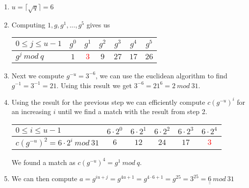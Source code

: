 \begin{enumerate}
\item $u = \lceil \sqrt{q} \rceil = 6$
\item Computing $1,g,g^1,...,g^5$ gives us  \\

\begin{tabular}{|l|c|c|c|c|c|c|}
    \hline  
    $0 \leq j \leq u-1$             &   $g^0$   &   $g^1$     &   $g^2$     &   $g^3$     &   $g^4$     &   $g^5$     \\
    \hline  
    $g^j \ mod \ q$ &   $1$       &   \textcolor{red}{$3$}       &   $9$       &   $27$      &   $17$      &   $26$      \\
    \hline 
\end{tabular}

\item Next we compute $g^{-u} = 3^{-6}$, we can use the euclidean algorithm to find $g^{-1} = 3^{-1} = 21$. Using this result we get $3^{-6} = 21^6 = 2 \ mod \ 31$. 

\item Using the result for the previous step we can efficiently compute $c(g^{-u})^i$ for an increasing $i$ until we find a match with the result from step 2. \\

\iffalse
\begin{align*}
    c(g^{-u})^0 &= 6 \cdot 2^0 = 6 \\
    c(g^{-u})^1 &= 6 \cdot 2^1 = 12 \\
    c(g^{-u})^2 &= 6 \cdot 2^2 = 24 \\
    c(g^{-u})^3 &= 6 \cdot 2^3 = 17 \ mod \ 31 \\
    c(g^{-u})^4 &= 6 \cdot 2^4 = 3 \ mod \ 13
\end{align*}
\fi 

\begin{tabular}{|l|c|c|c|c|c|}
    \hline  
    $0 \leq i \leq u-1$    &   $6 \cdot 2^0$   &   $6 \cdot 2^1$     &   $6 \cdot 2^2$     &   $6 \cdot 2^3$     &   $6 \cdot 2^4$        \\
    \hline  
    $c(g^{-u})^2 = 6 \cdot 2^i \ mod \ 31$ &   $6$   &   $12$   &   $24$   &   $17$      &   \textcolor{red}{$3$}       \\
    \hline 
\end{tabular}

We found a match as $c(g^{-u})^4 = g^1 \ mod \ q$. 
\item We can then compute $a = g^{iu+j} = g^{4u+1} = g^{4 \cdot 6 + 1} = g^{25} = 3^{25} = \underline{\underline{6}} \ mod \ 31$
\end{enumerate}



